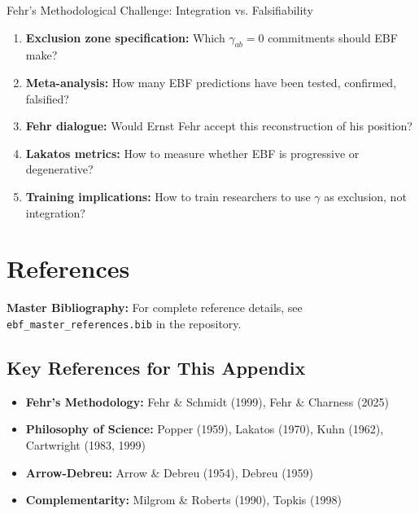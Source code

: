 \begin{chapter}{Fehr's Methodological Challenge: Integration vs. Falsifiability}
\begin{enumerate}
    \item \textbf{Exclusion zone specification:} Which $\gamma_{ab} = 0$ commitments should EBF make?

    \item \textbf{Meta-analysis:} How many EBF predictions have been tested, confirmed, falsified?

    \item \textbf{Fehr dialogue:} Would Ernst Fehr accept this reconstruction of his position?

    \item \textbf{Lakatos metrics:} How to measure whether EBF is progressive or degenerative?

    \item \textbf{Training implications:} How to train researchers to use $\gamma$ as exclusion, not integration?
\end{enumerate}


\section{References}
\label{sec:references}

\begin{tcolorbox}[colback=blue!5!white,colframe=blue!75!black]
\textbf{Master Bibliography:} For complete reference details, see
\texttt{ebf\_master\_references.bib} in the repository.
\end{tcolorbox}

\subsection{Key References for This Appendix}

\begin{itemize}[noitemsep]
    \item \textbf{Fehr's Methodology:} Fehr \& Schmidt (1999), Fehr \& Charness (2025)
    \item \textbf{Philosophy of Science:} Popper (1959), Lakatos (1970), Kuhn (1962), Cartwright (1983, 1999)
    \item \textbf{Arrow-Debreu:} Arrow \& Debreu (1954), Debreu (1959)
    \item \textbf{Complementarity:} Milgrom \& Roberts (1990), Topkis (1998)
\end{itemize}


\end{chapter}
